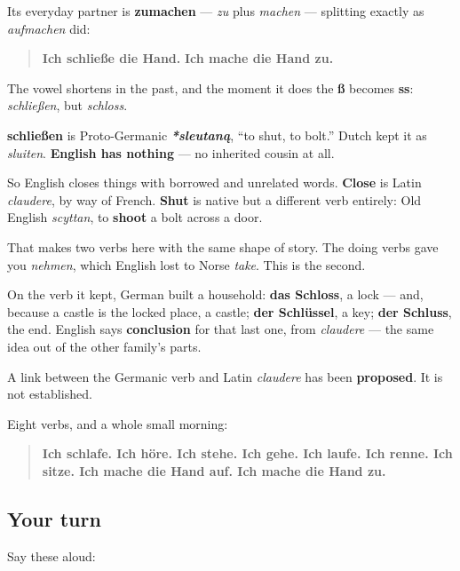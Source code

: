 Its everyday partner is \textbf{zumachen} — \emph{zu} plus \emph{machen} — splitting exactly as \emph{aufmachen} did:

\begin{quote}
\textbf{Ich schließe die Hand.} \textbf{Ich mache die Hand zu.}
\end{quote}

The vowel shortens in the past, and the moment it does the \textbf{ß} becomes \textbf{ss}: \emph{schließen}, but \emph{schloss}.

\begin{cousinweb}
\textbf{schließen} is Proto-Germanic \emph{\textbf{*sleutaną}}, \textquotedblleft{}to shut, to bolt.\textquotedblright{} Dutch kept it as \emph{sluiten}. \textbf{English has nothing} — no inherited cousin at all.

So English closes things with borrowed and unrelated words. \textbf{Close} is Latin \emph{claudere}, by way of French. \textbf{Shut} is native but a different verb entirely: Old English \emph{scyttan}, to \textbf{shoot} a bolt across a door.

That makes two verbs here with the same shape of story. The doing verbs gave you \emph{nehmen}, which English lost to Norse \emph{take}. This is the second.

On the verb it kept, German built a household: \textbf{das Schloss}, a lock — and, because a castle is the locked place, a castle; \textbf{der Schlüssel}, a key; \textbf{der Schluss}, the end. English says \textbf{conclusion} for that last one, from \emph{claudere} — the same idea out of the other family's parts.

A link between the Germanic verb and Latin \emph{claudere} has been \textbf{proposed}. It is not established.
\end{cousinweb}

\begin{grammarlens}[title={What you've built across these two chapters}]
Eight verbs, and a whole small morning:

\begin{quote}
\textbf{Ich schlafe. Ich höre. Ich stehe. Ich gehe. Ich laufe. Ich renne. Ich sitze. Ich mache die Hand auf. Ich mache die Hand zu.}
\end{quote}
\end{grammarlens}

\subsection*{Your turn}
Say these aloud:

